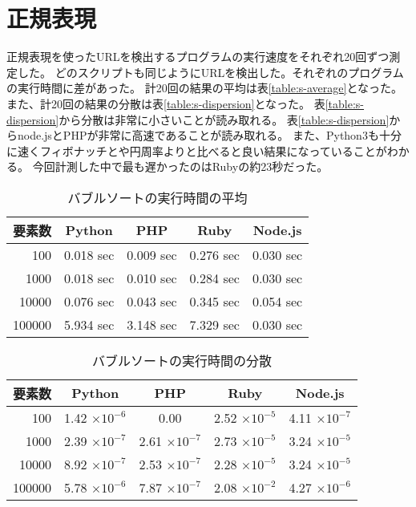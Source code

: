 \section{正規表現}
正規表現を使ったURLを検出するプログラムの実行速度をそれぞれ20回ずつ測定した。
どのスクリプトも同じようにURLを検出した。それぞれのプログラムの実行時間に差があった。
計20回の結果の平均は表\ref{table:s-average}となった。
また、計20回の結果の分散は表\ref{table:s-dispersion}となった。
表\ref{table:s-dispersion}から分散は非常に小さいことが読み取れる。
表\ref{table:s-dispersion}からnode.jsとPHPが非常に高速であることが読み取れる。
また、Python3も十分に速くフィボナッチとや円周率よりと比べると良い結果になっていることがわかる。
今回計測した中で最も遅かったのはRubyの約23秒だった。

\begin{table}[tb]
\centering
\begin{tabular}{|r||c|c|c|c|}
\hline
要素数 & Python & PHP &Ruby	&Node.js \\ \hline \hline
100	    & 0.018 sec & 0.009 sec	& 0.276	sec & 0.030 sec \\ \hline
1000	& 0.018 sec	& 0.010 sec	& 0.284	sec & 0.030 sec \\ \hline
10000	& 0.076 sec	& 0.043 sec	& 0.345	sec & 0.054 sec \\ \hline
100000	& 5.934 sec	& 3.148	sec & 7.329	sec & 0.030 sec \\ \hline
\end{tabular}
\caption{バブルソートの実行時間の平均}
\label{table:b-average}
\end{table}

\begin{table}[tb]
\centering
\begin{tabular}{|r||c|c|c|c|}
\hline
要素数 & Python & PHP &Ruby	&Node.js \\ \hline \hline
100     & 1.42 $\times 10^{-6}$ & 0.00                  & 2.52 $\times 10^{-5}$	& 4.11 $\times 10^{-7}$ \\ \hline
1000	& 2.39 $\times 10^{-7}$ & 2.61 $\times 10^{-7}$ & 2.73 $\times 10^{-5}$	& 3.24 $\times 10^{-5}$ \\ \hline
10000	& 8.92 $\times 10^{-7}$ & 2.53 $\times 10^{-7}$ & 2.28 $\times 10^{-5}$ & 3.24 $\times 10^{-5}$ \\ \hline
100000	& 5.78 $\times 10^{-6}$ & 7.87 $\times 10^{-7}$ & 2.08 $\times 10^{-2}$ & 4.27 $\times 10^{-6}$ \\ \hline
\end{tabular}
\caption{バブルソートの実行時間の分散}
\label{table:b-dispersion}
\end{table}

